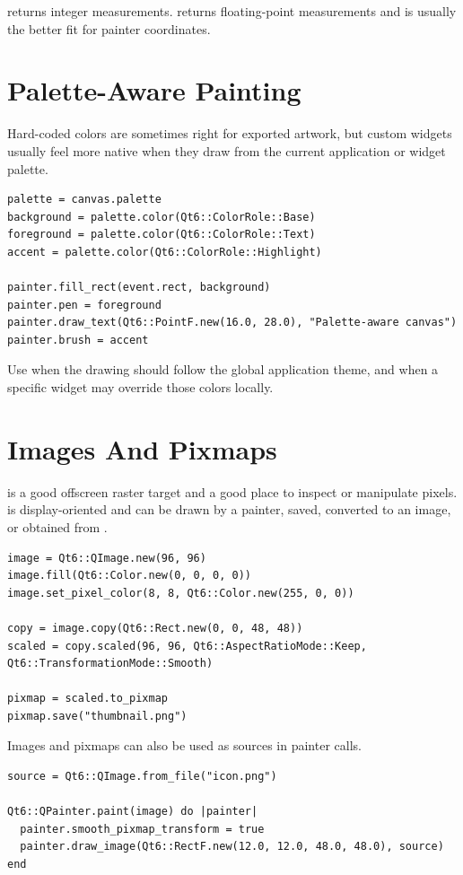  returns integer measurements.  returns floating-point measurements and is usually the better fit for painter coordinates.

\section{Palette-Aware Painting}

Hard-coded colors are sometimes right for exported artwork, but custom widgets usually feel more native when they draw from the current application or widget palette.

\begin{lstlisting}[style=crystal]
palette = canvas.palette
background = palette.color(Qt6::ColorRole::Base)
foreground = palette.color(Qt6::ColorRole::Text)
accent = palette.color(Qt6::ColorRole::Highlight)

painter.fill_rect(event.rect, background)
painter.pen = foreground
painter.draw_text(Qt6::PointF.new(16.0, 28.0), "Palette-aware canvas")
painter.brush = accent
\end{lstlisting}

Use  when the drawing should follow the global application theme, and  when a specific widget may override those colors locally.

\section{Images And Pixmaps}

 is a good offscreen raster target and a good place to inspect or manipulate pixels.  is display-oriented and can be drawn by a painter, saved, converted to an image, or obtained from .

\begin{lstlisting}[style=crystal]
image = Qt6::QImage.new(96, 96)
image.fill(Qt6::Color.new(0, 0, 0, 0))
image.set_pixel_color(8, 8, Qt6::Color.new(255, 0, 0))

copy = image.copy(Qt6::Rect.new(0, 0, 48, 48))
scaled = copy.scaled(96, 96, Qt6::AspectRatioMode::Keep, Qt6::TransformationMode::Smooth)

pixmap = scaled.to_pixmap
pixmap.save("thumbnail.png")
\end{lstlisting}

Images and pixmaps can also be used as sources in painter calls.

\begin{lstlisting}[style=crystal]
source = Qt6::QImage.from_file("icon.png")

Qt6::QPainter.paint(image) do |painter|
  painter.smooth_pixmap_transform = true
  painter.draw_image(Qt6::RectF.new(12.0, 12.0, 48.0, 48.0), source)
end
\end{lstlisting}

